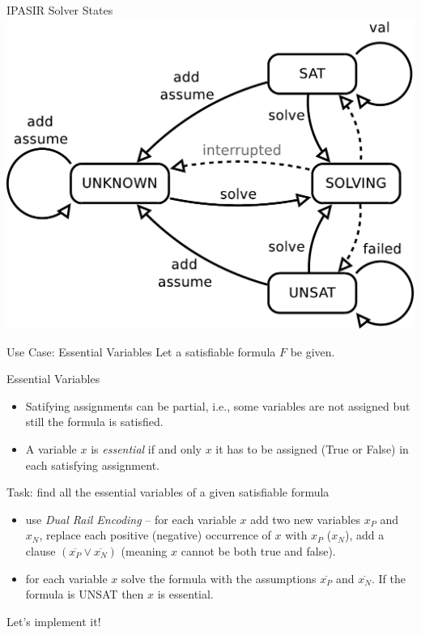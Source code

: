 \documentclass[t]{sdqbeamer}
\begin{document}
\begin{frame}{IPASIR Solver States}
\centering
\includegraphics[height=.75\textheight]{figures/l01/ipasir.pdf}
\end{frame}

\begin{frame}{Use Case: Essential Variables}
Let a satisfiable formula $F$ be given.
\begin{block}{Essential Variables}
\begin{itemize}\setlength{\itemsep}{1em}
	\item Satifying assignments can be partial, i.e., some variables are not assigned but still the formula is satisfied.
	\item A variable $x$ is \emph{essential} if and only $x$ it has to be assigned (True or False) in each satisfying assignment.
\end{itemize}
\end{block}
\begin{block}{Task: find all the essential variables of a given satisfiable formula}
	\begin{itemize}\setlength{\itemsep}{1ex}
		\item use \emph{Dual Rail Encoding} -- for each variable $x$ add two new variables $x_P$ and $x_N$,
		replace each positive (negative) occurrence of $x$ with $x_P$ ($x_N$), add a clause
		$(\overline{x_P} \vee \overline{x_N})$ (meaning $x$ cannot be both true and false).
		\item for each variable $x$ solve the formula with the assumptions $\overline{x_P}$ and
		$\overline{x_N}$. If the formula is UNSAT then $x$ is essential.
	\end{itemize}
\end{block}
\begin{alert}{Let's implement it!}
	
\end{alert}
\end{frame}
\end{document}
